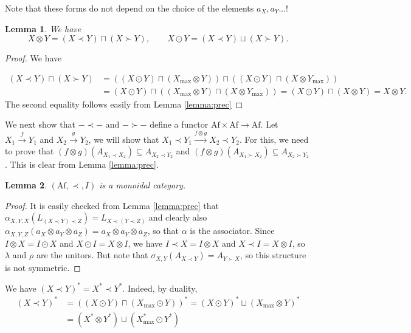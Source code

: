 \documentclass[12pt]{article}
\newtheorem{lemma}{Lemma}
\theoremstyle{definition}
\theoremstyle{remark}
\def \Af{\mathrm{Af}}
\begin{document}
Note that these forms do not depend on the choice of the elements $a_X,a_Y$...!

\begin{lemma}\label{lemma:decomp} We have
\[
X\otimes Y=(X\prec Y) \sqcap (X\succ Y),\qquad X\odot Y= (X\prec Y)\sqcup (X\succ Y).
\]

\end{lemma}

\begin{proof} We have 

\begin{align*}
(X\prec Y) \sqcap (X\succ Y)&=((X\odot Y)\sqcap (X_{\max}\otimes Y))\sqcap ((X\odot
Y)\sqcap (X\otimes Y_{\max}))\\
&= (X\odot Y) \sqcap((X_{\max}\otimes Y)\sqcap (X\otimes Y_{\max}))=(X\odot Y)\sqcap
(X\otimes Y)=X\otimes Y.
\end{align*}
The second equality follows easily from Lemma \ref{lemma:prec}
\end{proof}

We next show that $-\prec -$ and $-\succ -$ define a functor $\Af\times \Af\to \Af$. Let
$X_1\xrightarrow{f} Y_1$ and $X_2\xrightarrow{g} Y_2$, we will show that 
$X_1\prec Y_1\xrightarrow{f\otimes g} X_2\prec Y_2$. For this, we need to prove that 
$(f\otimes g)(A_{X_1\prec X_2})\subseteq A_{X_2\prec Y_2}$ and $(f\otimes g)(A_{X_1\succ
X_2})\subseteq A_{X_2\succ Y_2}$. This is clear from Lemma \ref{lemma:prec}. 



\begin{lemma}\label{lemma:precmonoidal} $(\Af,\prec,I)$ is a monoidal category.  

\end{lemma}

\begin{proof} It is easily checked from Lemma \ref{lemma:prec} that
$\alpha_{X,Y,X}(L_{(X\prec Y)\prec Z})=L_{X\prec(Y\prec Z)}$ and clearly also
$\alpha_{X,Y,Z}(a_X\otimes a_Y\otimes a_Z)=a_X\otimes a_Y\otimes a_Z$, so that $\alpha$ is
the associator. Since $I\otimes X=I\odot X$ and $X\odot I=X\otimes I$, we have 
$I\prec X=I\otimes X$ and $X\prec I=X\otimes I$, so $\lambda$ and $\rho$ are the
unitors. But note that $\sigma_{X,Y}(A_{X\prec Y})=A_{Y\succ X}$, so this structure is
not symmetric. 

\end{proof}

We have $(X\prec Y)^*=X^*\prec Y^*$. Indeed, by duality,
\begin{align*}
(X\prec Y)^*&=((X\odot Y)\sqcap (X_{\max}\odot Y))^*=(X\odot Y)^*\sqcup (X_{\max}\otimes
Y)^*\\
&= (X^*\otimes Y^*)\sqcup (X_{\max}^*\odot Y^*)
\end{align*}
\end{document}
